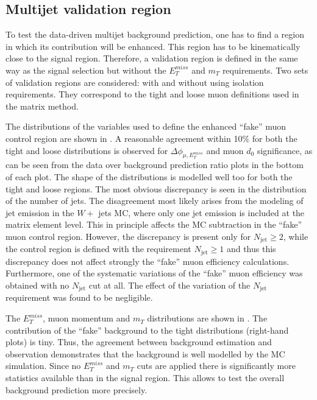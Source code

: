 \subsection{Multijet validation region}

To test the data-driven multijet background prediction, one has to find a region in which its contribution will be enhanced. 
This region has to be kinematically close to the signal region.
Therefore, a validation region is defined in the same way as the signal selection but without the $E_T^{miss}$ and $m_T$ requirements. 
Two sets of validation regions are considered: with and without using isolation requirements. They correspond to the tight and loose muon definitions used in the matrix method.

The distributions of the variables used to define the enhanced ``fake'' muon control region are shown in .
A reasonable agreement within 10$\%$ for both the tight and loose distributions is observed for $\Delta\phi_{\mu,E_T^{miss}}$ and muon $d_0$ significance, as can be seen from the data over background prediction ratio plots in the bottom of each plot. The shape of the distributions is modelled well too for both the tight and loose regions.
The most obvious discrepancy is seen in the
distribution of the number of jets. The disagreement most likely arises from the modeling of jet emission in the $W +$ jets MC, where only one jet emission is included at the
matrix element level.
This in principle affects the MC subtraction in the ``fake'' muon control region.
However, the discrepancy is present only for $N_\mathrm{jet}\geq2$, while the control region is 
defined with the requirement $N_\mathrm{jet}\geq1$ and thus this discrepancy does not affect strongly the ``fake'' muon efficiency calculations.
Furthermore, one of the systematic variations of the ``fake'' muon efficiency was obtained with no $N_\mathrm{jet}$ cut at all. The effect of the variation of the $N_\mathrm{jet}$ requirement was found to be negligible. 

The $E_T^{miss}$, muon momentum and $m_T$ distributions are shown in .
The contribution of the ``fake'' background to the tight distributions (right-hand plots) is tiny. Thus, the agreement between background estimation and observation demonstrates that the background is well modelled by the MC simulation.
Since no $E_T^{miss}$ and $m_T$ cuts are applied there is significantly more statistics available than in the signal region. This allows to test the overall background prediction more precisely.


